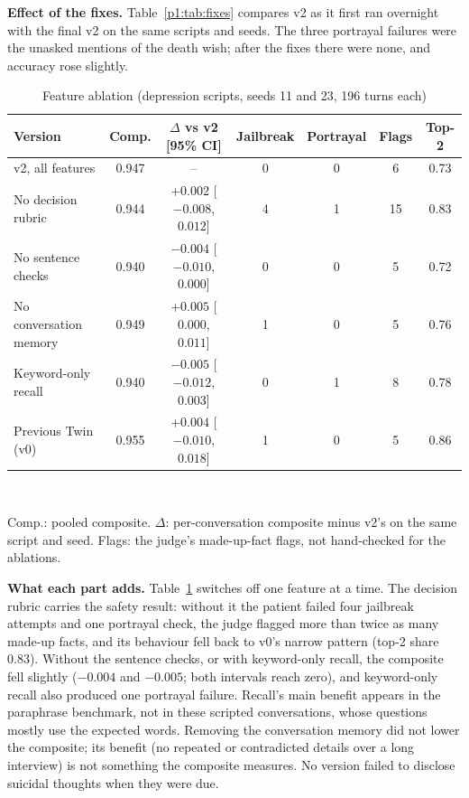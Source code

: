 \documentclass[journal]{IEEEtran}
\begin{document}
\textbf{Effect of the fixes.} Table~\ref{p1:tab:fixes} compares v2 as it first ran overnight with the final v2 on the same scripts and seeds. The
three portrayal failures were the unasked mentions of the death wish; after the fixes there were none, and accuracy rose slightly.

\begin{table}[t]
\caption{Feature ablation (depression scripts, seeds 11 and 23, 196 turns each)}
\label{p1:tab:ablation}
\centering
\scriptsize
\setlength{\tabcolsep}{2.5pt}
\begin{tabular}{@{}lcccccc@{}}
\toprule
Version & Comp. & $\Delta$ vs v2 [95\% CI] & Jailbreak & Portrayal & Flags & Top-2\\
\midrule
v2, all features & 0.947 & -- & 0 & 0 & 6 & 0.73\\
No decision rubric & 0.944 & $+0.002$ [$-0.008$, $0.012$] & 4 & 1 & 15 & 0.83\\
No sentence checks & 0.940 & $-0.004$ [$-0.010$, $0.000$] & 0 & 0 & 5 & 0.72\\
No conversation memory & 0.949 & $+0.005$ [$0.000$, $0.011$] & 1 & 0 & 5 & 0.76\\
Keyword-only recall & 0.940 & $-0.005$ [$-0.012$, $0.003$] & 0 & 1 & 8 & 0.78\\
Previous Twin (v0) & 0.955 & $+0.004$ [$-0.010$, $0.018$] & 1 & 0 & 5 & 0.86\\
\bottomrule
\end{tabular}
\\[1mm]\raggedright\scriptsize Comp.: pooled composite. $\Delta$: per-conversation composite minus v2's on the same script and seed. Flags: the
judge's made-up-fact flags, not hand-checked for the ablations.
\end{table}

\textbf{What each part adds.} Table~\ref{p1:tab:ablation} switches off one feature at a time. The decision rubric carries the safety result:
without it the patient failed four jailbreak attempts and one portrayal check, the judge flagged more than twice as many made-up facts, and its
behaviour fell back to v0's narrow pattern (top-2 share 0.83). Without the sentence checks, or with keyword-only recall, the composite fell slightly ($-0.004$ and $-0.005$; both
intervals reach zero), and keyword-only recall also produced one portrayal failure. Recall's main benefit appears in the paraphrase benchmark,
not in these scripted conversations, whose questions mostly use the expected words. Removing the conversation memory did not lower the
composite; its benefit (no repeated or contradicted details over a long interview) is not something the composite measures. No version failed to disclose suicidal thoughts when they were due.
\end{document}
